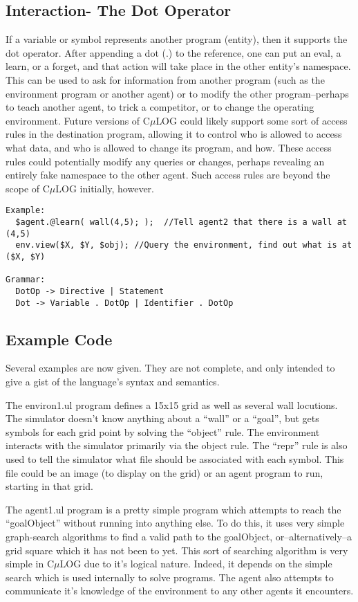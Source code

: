 \documentclass[onecolumn,titlepage]{article}
\begin{document}
\subsection{Interaction- The Dot Operator}
If a variable or symbol represents another program (entity), then it supports
the dot operator.  After appending a dot (.) to the reference, one can put
an eval, a learn, or a forget, and that action will take place in the other
entity's namespace.  This can be used to ask for information from another program
(such as the environment program or another agent) or to modify the other
program--perhaps to teach another agent, to trick a competitor, or to change
the operating environment.  Future versions of C$\mu$LOG could likely support
some sort of access rules in the destination program, allowing it to control who is
allowed to access what data, and who is allowed to change its program, and how.
These access rules could potentially modify any queries or changes, perhaps
revealing an entirely fake namespace to the other agent.  Such access rules are
beyond the scope of C$\mu$LOG initially, however.
\begin{verbatim}
Example:
  $agent.@learn( wall(4,5); );  //Tell agent2 that there is a wall at (4,5)
  env.view($X, $Y, $obj); //Query the environment, find out what is at ($X, $Y)

Grammar:
  DotOp -> Directive | Statement
  Dot -> Variable . DotOp | Identifier . DotOp
\end{verbatim}

\subsection{Example Code}
Several examples are now given.  They are not complete, and only intended
to give a gist of the language's syntax and semantics.

The environ1.ul program defines a 15x15 grid as well as several wall locutions.
The simulator doesn't know anything about a ``wall'' or a ``goal'', but gets
symbols for each grid point by solving the ``object'' rule.  The environment
interacts with the simulator primarily via the object rule.  The ``repr'' rule
is also used to tell the simulator what file should be associated with each
symbol.  This file could be an image (to display on the grid) or an agent program
to run, starting in that grid.

The agent1.ul program is a pretty simple program which attempts to reach the ``goalObject''
without running into anything else. To do this, it uses very simple graph-search 
algorithms to find a valid path to the goalObject, or--alternatively--a grid square
which it has not been to yet.  This sort of searching algorithm is very simple in
C$\mu$LOG due to it's logical nature.  Indeed, it depends on the simple search 
which is used internally to solve programs.  The agent also attempts to communicate it's 
knowledge of the environment to any other agents it encounters.
\end{document}
